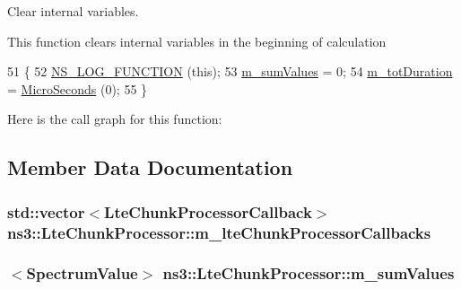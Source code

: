 Clear internal variables. 

This function clears internal variables in the beginning of calculation 
\begin{DoxyCode}
51 \{
52   \hyperlink{log-macros-disabled_8h_a90b90d5bad1f39cb1b64923ea94c0761}{NS\_LOG\_FUNCTION} (\textcolor{keyword}{this});
53   \hyperlink{classns3_1_1LteChunkProcessor_a9533cb905f6036358c4648948261e9e5}{m\_sumValues} = 0;
54   \hyperlink{classns3_1_1LteChunkProcessor_ac2cb1b59dff73aa02a7ced8c10f32442}{m\_totDuration} = \hyperlink{group__timecivil_ga17465a639c8d1464e76538afdd78a9f0}{MicroSeconds} (0);
55 \}
\end{DoxyCode}


Here is the call graph for this function\+:




\subsection{Member Data Documentation}
\subsubsection[{\texorpdfstring{m\+\_\+lte\+Chunk\+Processor\+Callbacks}{m_lteChunkProcessorCallbacks}}]{\setlength{\rightskip}{0pt plus 5cm}std\+::vector$<${\bf Lte\+Chunk\+Processor\+Callback}$>$ ns3\+::\+Lte\+Chunk\+Processor\+::m\+\_\+lte\+Chunk\+Processor\+Callbacks\hspace{0.3cm}{\ttfamily [private]}}\hypertarget{classns3_1_1LteChunkProcessor_ae72660f4bbcabbf934fe7ca787643dc1}{}\label{classns3_1_1LteChunkProcessor_ae72660f4bbcabbf934fe7ca787643dc1}
\subsubsection[{\texorpdfstring{m\+\_\+sum\+Values}{m_sumValues}}]{$<${\bf Spectrum\+Value}$>$ ns3\+::\+Lte\+Chunk\+Processor\+::m\+\_\+sum\+Values\hspace{0.3cm}{\ttfamily [private]}}\hypertarget{classns3_1_1LteChunkProcessor_a9533cb905f6036358c4648948261e9e5}{}\label{classns3_1_1LteChunkProcessor_a9533cb905f6036358c4648948261e9e5}
